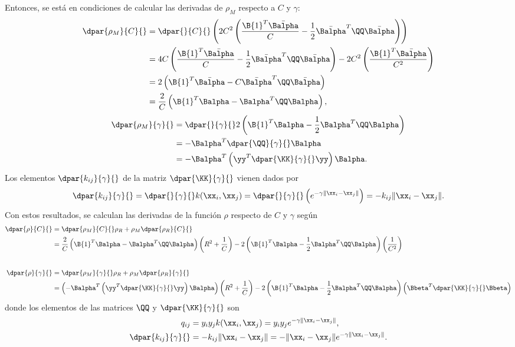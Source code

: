 %
Entonces, se está en condiciones de calcular las derivadas
de $\rho_M$ respecto a $C$ y $\gamma$:
%
\begin{align}
    \dpar{\rho_M}{C}{}
    &= \dpar{}{C}{}\left( 2C^2\left(\frac{\B{1}^T\bar{\Balpha}}{C} -
    \frac{1}{2}\bar{\Balpha}^T\QQ\bar{\Balpha}\right)
    \right) \\
    &= 4C \left(\frac{\B{1}^T\bar{\Balpha}}{C} -
    \frac{1}{2}\bar{\Balpha}^T\QQ\bar{\Balpha}\right)
    - 2C^2 \left(\frac{\B{1}^T\bar{\Balpha}}{C^2} \right) \\
    &= 2\left(\B{1}^T\bar{\Balpha}
    - C \bar{\Balpha}^T\QQ\bar{\Balpha}\right) \\
    &= \frac{2}{C} \left(\B{1}^T\Balpha - \Balpha^T\QQ\Balpha\right),
\end{align}
%
%
\begin{align}
    \dpar{\rho_M}{\gamma}{}
    &= \dpar{}{\gamma}{}
    2\left(  \B{1}^T\Balpha-\frac{1}{2}\Balpha^T\QQ\Balpha \right) \\
    &= - \Balpha^T \dpar{\QQ}{\gamma}{}\Balpha \\
    & = - \Balpha^T \left(\yy^T \dpar{\KK}{\gamma}{}\yy\right) \Balpha.
\end{align}
%
Los elementos $\dpar{k_{ij}}{\gamma}{}$ de la matriz $\dpar{\KK}{\gamma}{}$
vienen dados por
%
\begin{align}
  \dpar{k_{ij}}{\gamma}{}
  = \dpar{}{\gamma}{}k(\xx_i,\xx_j)
  = \dpar{}{\gamma}{} \left(e^{-\gamma\|\xx_i-\xx_j\|}\right)
  = -k_{ij}\|\xx_i-\xx_j\|.
\end{align}
%
Con estos resultados, se calculan las derivadas de la función $\rho$
respecto de $C$ y $\gamma$ según
%
\begin{align}
    \dpar{\rho}{C}{} &= \dpar{\rho_M}{C}{} \rho_R + \rho_M \dpar{\rho_R}{C}{} \\
    &= \frac{2}{C} \left(\B{1}^T\Balpha - \Balpha^T\QQ\Balpha\right) \left( R^2 + \frac{1}{C} \right)
    - 2\left(  \B{1}^T\Balpha-\frac{1}{2}\Balpha^T\QQ\Balpha \right)
    \left( \frac{1}{C^2} \right)  \\[2em]
    \dpar{\rho}{\gamma}{} &= \dpar{\rho_M}{\gamma}{} \rho_R + \rho_M \dpar{\rho_R}{\gamma}{}\\
    &= \left( - \Balpha^T \left(\yy^T \dpar{\KK}{\gamma}{}\yy\right) \Balpha \right)
    \left( R^2 + \frac{1}{C} \right)
    - 2\left(  \B{1}^T\Balpha-\frac{1}{2}\Balpha^T\QQ\Balpha \right)
    \left( \Bbeta^T \dpar{\KK}{\gamma}{} \Bbeta \right)
\end{align}
%
donde los elementos de las matrices $\QQ$ y $\dpar{\KK}{\gamma}{}$ son
%
\begin{align}
  q_{ij}&=y_i y_j k(\xx_i,\xx_j)= y_i y_j e^{-\gamma\|\xx_i-\xx_j\|}, \\
  \dpar{k_{ij}}{\gamma}{}&=-k_{ij}\|\xx_i-\xx_j\| = -\|\xx_i-\xx_j\|e^{-\gamma\|\xx_i-\xx_j\|}.
\end{align}
%
